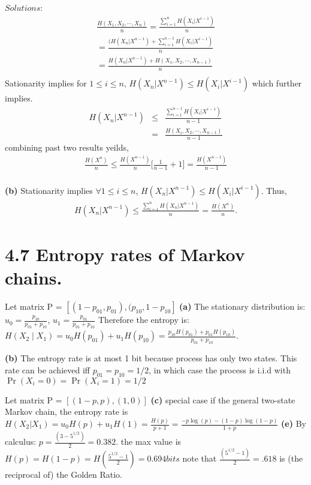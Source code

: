 \documentclass[10pt]{article}
\begin{document}
\begin{tiny}
\begin{multicols}{3}
$Solutions$:
\begin{eqnarray*}
\frac{H(X_1,X_2,\cdots,X_n)}{n} = \frac{\sum_{i=1}^n H(X_i | X^{i-1})}{n} \\ 
= \frac{(H(X_n | X^{n-1}) + \sum_{i=1}^{n-1} H(X_i |X^{i-1}) } {n} \\ 
= \frac{H(X_n | X^{n-1}) + H(X_1,X_2,\cdots,X_{n-1}) } {n} \\
\end{eqnarray*}
Sationarity implies for $1\le i \le n$, $H(X_n | X^{n-1}) \le H(X_i | X^{i-1}) $
which further implies.
\begin{eqnarray*}
H(X_n | X^{n-1}) &\le& \frac{ \sum_{i=1}^{n-1} H(X_i | X^{i-1})} {n-1} \\
&=& \frac{ H(X_i,X_2,\cdots,X_{n-1})} {n-1}
\end{eqnarray*}
combining past two results yeilds, 
\begin{eqnarray*}
\frac{H(X^n)}{n} \leq \frac{H(X^{n-1})}{n} \bigg[ \frac{ 1 } {n-1}  + 1 \bigg]
= \frac{H(X^{n-1})}{n-1}
\end{eqnarray*}
\\
\textbf{(b)} Stationarity implies $\forall 1 \leq i \leq n$, $H(X_n |
X^{n-1} ) \leq H(X_i | X^{i-1})$. Thus,
\begin{eqnarray*}
H(X_n | X^{n-1}) \leq \frac{\sum_{i=1}^n H(X_n | X^{n-1}) } {n}
= \frac{H(X^n)}{n}.
\end{eqnarray*}


\section*{4.7 Entropy rates of Markov chains.}

Let matrix P = $[ (1-p_{01}, p_{01}), (p_{10}, 1-p_{10}]$ 
\textbf{(a)} The stationary distribution is: $u_0=\frac{p_{10}}{p_{01}+p_{10}}$, $u_1=\frac{p_{01}}{p_{01}+p_{10}}$
Therefore the entropy is: \( H(X_2 \mid X_1) = u_0H(p_{01})+u_1H(p_{10}) = \frac{p_{10}H(p_{01})+ p_{01}H(p_{10})}{p_{01}+p_{10}}. \)

\textbf{(b)} The entropy rate is at most 1 bit because process has only two states. This rate can be achieved iff \(p_{01}=p_{10}=1/2 \), in which case the process is i.i.d with \( \Pr(X_i = 0) =\Pr(X_i=1) = 1/2 \)

Let matrix P = $[ (1-p, p), (1, 0)]$ 
\textbf{(c)} special case if the general two-state Markov chain, the entropy rate is \( H(X_2 | X_1)=u_0H(p)+u_1H(1)=\frac{H(p)}{p+1} = \frac{-p\log(p)-(1-p)\log(1-p)}{1+p} \)
\textbf{(e)} By calculus: \( p=\frac{(3-5^{1/2})}{2}=0.382.\) the max value is \(H(p)=H(1-p)=H(\frac{5^{1/2}-1}{2}) = 0.694bits\)
note that \( \frac{(5^{1/2}-1)}{2} =.618\) is (the reciprocal of) the Golden Ratio.


\end{multicols}
\end{tiny}
\end{document}
